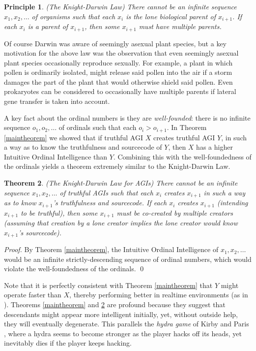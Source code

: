 \documentclass[runningheads]{llncs}
\newtheorem{mytheorem}{Theorem}
\newtheorem{myprinciple}[mytheorem]{Principle}
\begin{document}
\begin{myprinciple}
(The Knight-Darwin Law)
There cannot be an infinite sequence
$x_1,x_2,\ldots$ of organisms such that each $x_i$
is the lone biological parent of $x_{i+1}$.
If each $x_i$ is a parent of $x_{i+1}$, then some $x_{i+1}$
must have multiple parents.
\end{myprinciple}

Of course Darwin was aware of seemingly asexual plant species, but
a key motivation for the above law was the observation that even
seemingly asexual plant species occasionally reproduce sexually.
For example, a plant in which pollen is ordinarily isolated, might
release said pollen into the air if a storm damages the part of the
plant that would otherwise shield said pollen. Even prokaryotes can
be considered to occasionally have multiple parents if lateral gene
transfer is taken into account.

A key fact about the ordinal numbers is they are
\emph{well-founded}: there is
no infinite sequence $o_1,o_2,\ldots$ of ordinals such that each
$o_i>o_{i+1}$. In Theorem \ref{maintheorem} we showed that if truthful
AGI $X$ creates truthful AGI $Y$, in such a way as to know the truthfulness
and sourcecode of $Y$, then $X$ has a higher Intuitive Ordinal Intelligence
than $Y$. Combining this with the well-foundedness of the ordinals yields
a theorem extremely similar to the Knight-Darwin Law.

\begin{mytheorem}
\label{maintheorem2}
(The Knight-Darwin Law for AGIs)
There cannot be an infinite sequence
$x_1,x_2,\ldots$ of truthful AGIs such that each $x_i$
creates $x_{i+1}$ in such a way as to know $x_{i+1}$'s truthfulness and sourcecode.
If each $x_i$ creates $x_{i+1}$ (intending $x_{i+1}$ to be truthful), then
some $x_{i+1}$ must be co-created by multiple creators (assuming that creation by
a lone creator implies the lone creator would know $x_{i+1}$'s sourcecode).
\end{mytheorem}

\begin{proof}
By Theorem \ref{maintheorem}, the Intuitive Ordinal Intelligence of $x_1,x_2,\ldots$
would be an infinite strictly-descending sequence of ordinal numbers, which would
violate the well-foundedness of the ordinals.
\qed
\end{proof}

Note that it is perfectly consistent with
Theorem \ref{maintheorem} that $Y$ might operate faster
than $X$, thereby performing better in realtime environments (as in \cite{gavane}).
Theorems \ref{maintheorem} and \ref{maintheorem2} are profound because
they suggest that descendants might appear more intelligent
initially, yet, without outside help, they will eventually degenerate.
This parallels the \emph{hydra game} of
Kirby and Paris \cite{kirby1982accessible}, where a hydra
seems to become stronger as the player hacks off its heads, yet
inevitably dies if the player keeps hacking.
\end{document}
